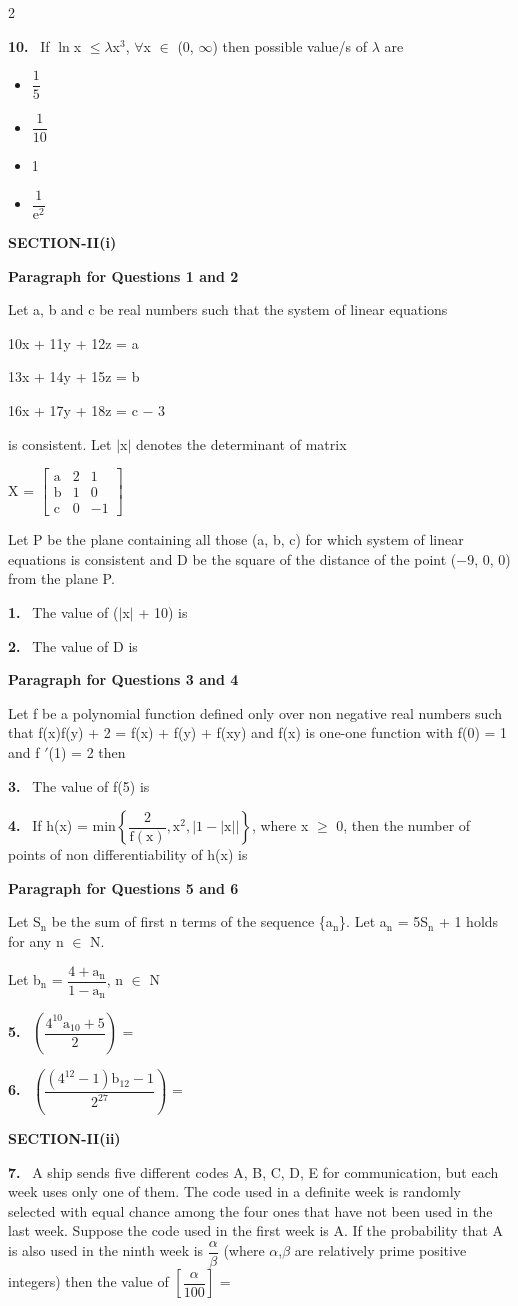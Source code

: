 \documentclass[10pt]{extarticle}
\newcommand{\sect}[1]{\par\smallskip\noindent\textbf{#1}\par}
\newcommand{\qn}[1]{\par\smallskip\noindent\textbf{#1.}~}
\newcommand{\paraq}[2]{\par\smallskip\noindent\textbf{Paragraph for Questions #1 and #2}\par}
\newenvironment{qoptions}{\begin{itemize}[leftmargin=1.8em,itemsep=1pt,topsep=2pt,label={}]}{\end{itemize}}
\newcommand{\opt}[2]{\item[(#1)] #2}
\begin{document}
\begin{multicols}{2}
\qn{10} If $\ln$x $\leqslant\lambda$x$^3$, $\forall$x $\in$ (0, $\infty$) then possible value/s of $\lambda$ are
\begin{qoptions}
\opt{A}{$\dfrac15$}
\opt{B}{$\dfrac1{10}$}
\opt{C}{1}
\opt{D}{$\dfrac1{\mathrm e^2}$}
\end{qoptions}
\sect{SECTION-II(i)}
\paraq{1}{2}
Let a, b and c be real numbers such that the system of linear equations\par
10x + 11y + 12z = a\par
13x + 14y + 15z = b\par
16x + 17y + 18z = c $-$ 3\par
is consistent. Let $|$x$|$ denotes the determinant of matrix\par
X = $\begin{bmatrix}\mathrm a&2&1\\\mathrm b&1&0\\\mathrm c&0&-1\end{bmatrix}$\par
Let P be the plane containing all those (a, b, c) for which system of linear equations is consistent and D be the square of the distance of the point ($-$9, 0, 0) from the plane P.
\qn{1} The value of ($|$x$|$ + 10) is \underline{\hspace{1.2cm}}
\qn{2} The value of D is \underline{\hspace{1.2cm}}
\paraq{3}{4}
Let f be a polynomial function defined only over non negative real numbers such that f(x)f(y) + 2 = f(x) + f(y) + f(xy) and f(x) is one-one function with f(0) = 1 and f $'$(1) = 2 then
\qn{3} The value of f(5) is
\qn{4} If h(x) = min$\left\{\dfrac2{\mathrm f(\mathrm x)},\mathrm x^2,|1-|\mathrm x||\right\}$, where x $\geqslant$ 0, then the number of points of non differentiability of h(x) is
\paraq{5}{6}
Let S$_\mathrm n$ be the sum of first n terms of the sequence \{a$_\mathrm n$\}. Let a$_\mathrm n$ = 5S$_\mathrm n$ + 1 holds for any n $\in$ N.\par
Let b$_\mathrm n$ = $\dfrac{4+\mathrm a_\mathrm n}{1-\mathrm a_\mathrm n}$, n $\in$ N
\qn{5} $\left(\dfrac{4^{10}\mathrm a_{10}+5}2\right)$ =
\qn{6} $\left(\dfrac{(4^{12}-1)\mathrm b_{12}-1}{2^{27}}\right)$ =
\sect{SECTION-II(ii)}
\qn{7} A ship sends five different codes A, B, C, D, E for communication, but each week uses only one of them. The code used in a definite week is randomly selected with equal chance among the four ones that have not been used in the last week. Suppose the code used in the first week is A. If the probability that A is also used in the ninth week is $\dfrac\alpha\beta$ (where $\alpha$,$\beta$ are relatively prime positive integers) then the value of $\left[\dfrac\alpha{100}\right]$ = \par

\end{multicols}
\end{document}
